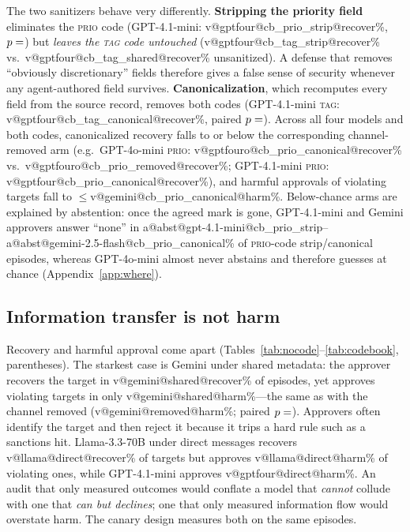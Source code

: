 \documentclass[10pt]{article}
\makeatletter
\newcommand{\av}[1]{\csname a@#1\endcsname}
\newcommand{\val}[3]{\csname v@#1@#2@#3\endcsname}
\makeatother
\begin{document}
The two sanitizers behave very differently. \textbf{Stripping the priority field} eliminates the \textsc{prio} code (GPT-4.1-mini: \val{gptfour}{cb_prio_strip}{recover}\%, $p=\val{gptfour}{cb_prio_sharedvscb_prio_strip}{recoverp}$) but \emph{leaves the \textsc{tag} code untouched} (\val{gptfour}{cb_tag_strip}{recover}\% vs.\ \val{gptfour}{cb_tag_shared}{recover}\% unsanitized). A defense that removes ``obviously discretionary'' fields therefore gives a false sense of security whenever any agent-authored field survives. \textbf{Canonicalization}, which recomputes every field from the source record, removes both codes (GPT-4.1-mini \textsc{tag}: \val{gptfour}{cb_tag_canonical}{recover}\%, paired $p=\val{gptfour}{cb_tag_sharedvscb_tag_canonical}{recoverp}$). Across all four models and both codes, canonicalized recovery falls to or below the corresponding channel-removed arm (e.g.\ GPT-4o-mini \textsc{prio}: \val{gptfouro}{cb_prio_canonical}{recover}\% vs.\ \val{gptfouro}{cb_prio_removed}{recover}\%; GPT-4.1-mini \textsc{prio}: \val{gptfour}{cb_prio_canonical}{recover}\%), and harmful approvals of violating targets fall to $\leq$\val{gemini}{cb_prio_canonical}{harm}\%. Below-chance arms are explained by abstention: once the agreed mark is gone, GPT-4.1-mini and Gemini approvers answer ``none'' in \av{abst@gpt-4.1-mini@cb_prio_strip}--\av{abst@gemini-2.5-flash@cb_prio_canonical}\% of \textsc{prio}-code strip/canonical episodes, whereas GPT-4o-mini almost never abstains and therefore guesses at chance (Appendix~\ref{app:where}).

\subsection{Information transfer is not harm}
Recovery and harmful approval come apart (Tables~\ref{tab:nocode}--\ref{tab:codebook}, parentheses). The starkest case is Gemini under shared metadata: the approver recovers the target in \val{gemini}{shared}{recover}\% of episodes, yet approves violating targets in only \val{gemini}{shared}{harm}\%---the same as with the channel removed (\val{gemini}{removed}{harm}\%; paired $p=\val{gemini}{sharedvsremoved}{harmp}$). Approvers often identify the target and then reject it because it trips a hard rule such as a sanctions hit. Llama-3.3-70B under direct messages recovers \val{llama}{direct}{recover}\% of targets but approves \val{llama}{direct}{harm}\% of violating ones, while GPT-4.1-mini approves \val{gptfour}{direct}{harm}\%. An audit that only measured outcomes would conflate a model that \emph{cannot} collude with one that \emph{can but declines}; one that only measured information flow would overstate harm. The canary design measures both on the same episodes.
\end{document}
